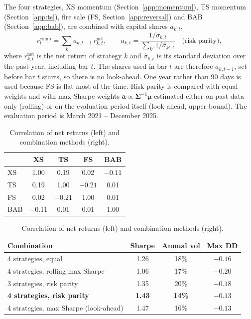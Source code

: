 \documentclass[aps,prl,onecolumn,superscriptaddress,nofootinbib]{revtex4-2}
\begin{document}
	The four strategies, XS momentum (Section~\ref{app:momentum}), TS momentum (Section~\ref{app:ts}), fire sale (FS, Section~\ref{app:reversal}) and BAB (Section~\ref{app:bab}), are combined with capital shares $a_{k,t}$,
	\begin{equation}
		r^{\mathrm{comb}}_t = \sum_{k} a_{k,t-1}\, r^{\mathrm{net}}_{k,t}, \qquad
		a_{k,t} = \frac{1/\hat\sigma_{k,t}}{\sum_{k'} 1/\hat\sigma_{k',t}} \quad \text{(risk parity)},
		\label{eq:combo}
	\end{equation}
	where $r^{\mathrm{net}}_{k,t}$ is the net return of strategy $k$ and $\hat\sigma_{k,t}$ is its standard deviation over the past year, including bar $t$. The shares used in bar $t$ are therefore $a_{k,t-1}$, set before bar $t$ starts, so there is no look-ahead. One year rather than 90 days is used because FS is flat most of the time. Risk parity is compared with equal weights and with max-Sharpe weights $\bm a \propto \bm\Sigma^{-1}\bm\mu$ estimated either on past data only (rolling) or on the evaluation period itself (look-ahead, upper bound). The evaluation period is March 2021 -- December 2025.
	
	\begin{table}[h]
		\caption{Correlation of net returns (left) and combination methods (right).}
		\label{tab:combo}
		\begin{minipage}{0.36\linewidth}
			\begin{ruledtabular}
				\begin{tabular}{lcccc}
					& XS      & TS      & FS      & BAB \\
					\hline
					XS  & 1.00    & 0.19    & 0.02    & $-0.11$ \\
					TS  & 0.19    & 1.00    & $-0.21$ & 0.01 \\
					FS  & 0.02    & $-0.21$ & 1.00    & 0.01 \\
					BAB & $-0.11$ & 0.01    & 0.01    & 1.00 \\
				\end{tabular}
			\end{ruledtabular}
		\end{minipage}\hfill
		\begin{minipage}{0.6\linewidth}
			\begin{ruledtabular}
				\begin{tabular}{lccc}
					Combination & Sharpe & Annual vol & Max DD \\
					\hline
					4 strategies, equal                    & 1.26 & 18\% & $-0.16$ \\
					4 strategies, rolling max Sharpe       & 1.06 & 17\% & $-0.20$ \\
					3 strategies, risk parity              & 1.35 & 20\% & $-0.18$ \\
					\textbf{4 strategies, risk parity}     & \textbf{1.43} & \textbf{14\%} & $\mathbf{-0.13}$ \\
					4 strategies, max Sharpe (look-ahead)  & 1.47 & 16\% & $-0.13$ \\
				\end{tabular}
			\end{ruledtabular}
		\end{minipage}
	\end{table}
	
\end{document}
